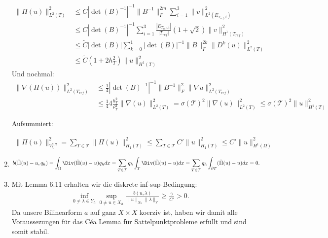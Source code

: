 \begin{solution}
\begin{enumerate}[label = \textbf{\alph*)}]
\begin{align*}
  \|\Pi(u)\|_{L^2(T)}^2 &\leq C|\det(B)^{-1}|^{-1}\|B^{-1}\|_F^{2m} \sum_{i=1}^{3}\|v\|_{L^2(E_{T_{ref},i})}^2  \\
  &\leq C|\det(B)^{-1}|^{-1} \sum_{i=1}^{3}\frac{|E_{T_{ref},i}|}{|T_{ref}|}
  \left(1 + \sqrt{2}\right)\|v\|_{H^1(T_{ref})}^2 \\
  &\leq \tilde{C}|\det(B)|
  \sum_{k=0}^1 |\det(B)|^{-1}\|B\|_F^{2k}\|D^k(u)\|_{L^2(T)}^2 \\
  &\leq \tilde{C}(1  + 2h_T^2)\|u\|_{H^1(T)}^2
\end{align*}
Und nochmal:
\begin{align*}
  \|\nabla(\Pi(u))\|_{L^2(T_{ref})}^2 &\leq \frac{1}{4} |\det(B)^{-1}|^{-1}
  \|B^{-1}\|_F^{2}\|\nabla u\|_{L^2(T_{ref})}^2 \\
  &\leq \frac{1}{4}4\frac{h_T^2}{\rho_T^2} \|\nabla(u)\|_{L^2(T)}^2
  = \sigma(\mathcal{T})^2 \|\nabla(u)\|_{L^2(T)}^2 \leq
  \sigma(\mathcal{T})^2 \|u\|_{H^1(T)}^2
\end{align*}

Aufsummiert:

\begin{align*}
  \|\Pi(u)\|_{V_h^{CR}}^2 = \sum_{T \in \mathcal{T}}\|\Pi(u)\|_{H_1(T)}^2
  \leq \sum_{T \in \mathcal{T}}C'\|u\|_{H_1(T)}^2
  \leq C'\|u\|_{H^1(\Omega)}^2
\end{align*}

  \item

  \begin{align*}
    b(\tilde{\Pi}(u) - u, q_h) = \int_\Omega \Div(\tilde{\Pi}(u) - u)q_h dx
    = \sum_{T \in \mathcal{T}}q_h\int_T \Div(\tilde{\Pi}(u) - u) dx
    = \sum_{T \in \mathcal{T}}q_h\int_{\partial T} (\tilde{\Pi}(u) - u) dx = 0.
  \end{align*}

  \item Mit Lemma 6.11 erhalten wir die diskrete inf-sup-Bedingung:
  \begin{align*}
    \inf_{0 \neq \lambda \in Y_h}\sup_{0 \neq u \in X_h}\frac{b(u,\lambda)}{\|u\|_{X_h}\|\lambda\|_Y}
    \geq \frac{\gamma}{C'} > 0.
  \end{align*}
  Da unsere Bilinearform $a$ auf ganz $X \times X$ koerziv ist, haben wir damit
  alle Voraussezungen für das Céa Lemma für Sattelpunktprobleme
  erfüllt und sind somit stabil.
\end{enumerate}


\end{solution}

